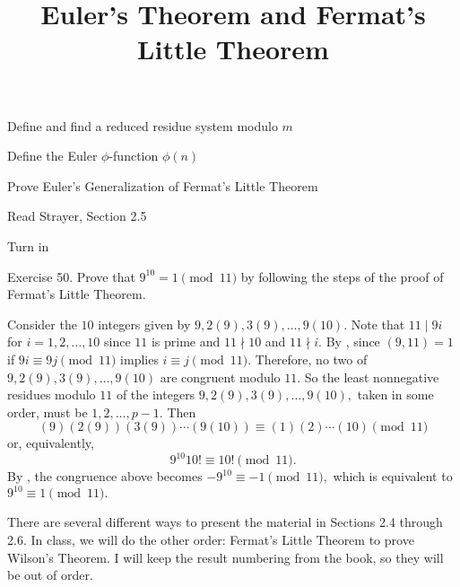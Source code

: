 \documentclass{ximera}
\title{Euler's Theorem and Fermat's Little Theorem}
\begin{document}
\begin{abstract}
\end{abstract}
\maketitle

\begin{obj}
	\item Define and find a reduced residue system modulo $m$
	\item Define the Euler $\phi$-function $\phi(n)$
	\item Prove Euler's Generalization of Fermat's Little Theorem
\end{obj}


\begin{instructorNotes}

\begin{pre} \item[Read] Strayer, Section 2.5

    \item[Turn in]  
    
    Exercise 50. Prove that $9^{10} = 1\pmod{11}$ by following the steps of the proof of Fermat's Little Theorem.
    
    \begin{solution}
        Consider the $10$ integers given by $9,2(9), 3(9),\dots, 9(10).$ Note that $11\mid 9i$ for $i=1,2,\dots,10$ since $11$ is prime and $11\nmid 10$ and $11\nmid i.$ By , since $(9,11)=1$ if $9i\equiv 9j\pmod{11}$ implies $i\equiv j\pmod{11}.$ Therefore, no two of $9,2(9), 3(9),\dots, 9(10)$ are congruent modulo $11.$ So the least nonnegative residues modulo $11$ of the integers $9,2(9), 3(9),\dots, 9(10),$ taken in some order, must be $1,2,\dots, p-1.$ Then \[(9)(2(9)) (3(9))\cdots (9(10))\equiv (1)(2)\cdots (10)\pmod{11}\] or, equivalently, \[9^{10}10!\equiv 10!\pmod{11}.\] By , the congruence above becomes $-9^{10}\equiv -1\pmod{11},$ which is equivalent to $9^{10}\equiv 1\pmod{11}.$
    \end{solution}
\end{pre}
    
\end{instructorNotes}


\begin{instructorNotes}
    There are several different ways to present the material in Sections 2.4 through 2.6. In class, we will do the other order: Fermat's Little Theorem to prove Wilson's Theorem. I will keep the result numbering from the book, so they will be out of order.
\end{instructorNotes}
\end{document}
